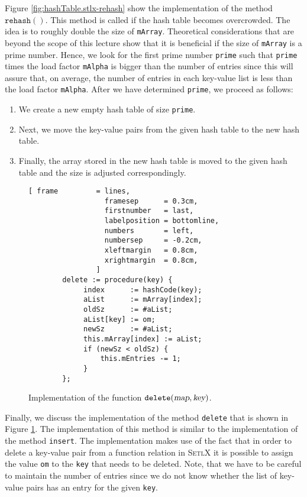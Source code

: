 Figure \ref{fig:hashTable.stlx-rehash} show the implementation of the method
$\mathtt{rehash}()$.  This method is called if the hash table becomes overcrowded.  The idea is to
roughly double the size of \texttt{mArray}.  Theoretical considerations that are  beyond the scope
of this lecture show that it is beneficial if the size of \texttt{mArray} is a prime number.
Hence, we look for the first prime number \texttt{prime} such that \texttt{prime} times the load
factor \texttt{mAlpha} is bigger than the
number of entries since this will assure that, on average, the number of entries in each key-value
list is less than the load factor \texttt{mAlpha}.  After we have determined \texttt{prime}, we
proceed as follows: 
\begin{enumerate}
\item We create a new empty hash table of size \texttt{prime}.
\item Next, we move the key-value pairs from the given hash table to the new hash table.
\item Finally, the array stored in the new hash table is moved to the given hash table
      and the size is adjusted correspondingly.
\end{enumerate}





\begin{figure}[!ht]
\centering
\begin{Verbatim}[ frame         = lines, 
                  framesep      = 0.3cm, 
                  firstnumber   = last,
                  labelposition = bottomline,
                  numbers       = left,
                  numbersep     = -0.2cm,
                  xleftmargin   = 0.8cm,
                  xrightmargin  = 0.8cm,
                ]
        delete := procedure(key) {
             index      := hashCode(key);
             aList      := mArray[index];
             oldSz      := #aList;
             aList[key] := om;
             newSz      := #aList;
             this.mArray[index] := aList;
             if (newSz < oldSz) {
                 this.mEntries -= 1;
             }    
        };
\end{Verbatim}
\vspace*{-0.3cm}
\caption{Implementation of the function $\mathtt{delete}(\textsl{map}, \textsl{key})$.}
\label{fig:hashTable.stlx-delete}
\end{figure}

Finally, we discuss the implementation of the method \texttt{delete} that is shown in Figure
\ref{fig:hashTable.stlx-delete}.  The implementation of this method is similar to the implementation
of the method \texttt{insert}.   The implementation makes use of the fact that in order to delete
a key-value pair from a function relation in \textsc{SetlX} it is possible to assign the value
\texttt{om} to the \texttt{key} that needs to be deleted. Note, that we have to be careful to
maintain the number of entries since we do not know whether the list of key-value pairs has an entry
for the given \texttt{key}.

